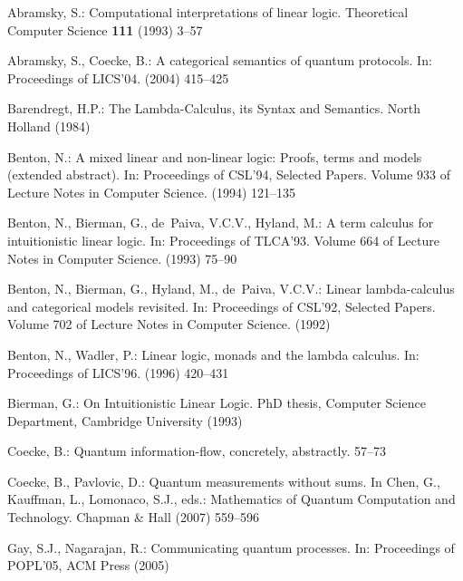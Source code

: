 \documentclass{llncs}
\begin{document}
\begin{thebibliography}{10}

Abramsky, S.:
\newblock Computational interpretations of linear logic.
\newblock Theoretical Computer Science \textbf{111} (1993)  3--57

Abramsky, S., Coecke, B.:
\newblock A categorical semantics of quantum protocols.
\newblock In: Proceedings of LICS'04. (2004)  415--425

Barendregt, H.P.:
\newblock The Lambda-Calculus, its Syntax and Semantics.
\newblock North Holland (1984)

Benton, N.:
\newblock A mixed linear and non-linear logic: Proofs, terms and models
  (extended abstract).
\newblock In: Proceedings of CSL'94, Selected Papers. Volume 933 of Lecture
  Notes in Computer Science. (1994)  121--135

Benton, N., Bierman, G., de~Paiva, V.C.V., Hyland, M.:
\newblock A term calculus for intuitionistic linear logic.
\newblock In: Proceedings of TLCA'93. Volume 664 of Lecture Notes in Computer
  Science. (1993)  75--90

Benton, N., Bierman, G., Hyland, M., de~Paiva, V.C.V.:
\newblock Linear lambda-calculus and categorical models revisited.
\newblock In: Proceedings of CSL'92, Selected Papers. Volume 702 of Lecture
  Notes in Computer Science. (1992)

Benton, N., Wadler, P.:
\newblock Linear logic, monads and the lambda calculus.
\newblock In: Proceedings of LICS'96. (1996)  420--431

Bierman, G.:
\newblock On Intuitionistic Linear Logic.
\newblock PhD thesis, Computer Science Department, Cambridge University (1993)

Coecke, B.:
\newblock Quantum information-flow, concretely, abstractly.
\newblock  \cite{qpl04}  57--73

Coecke, B., Pavlovic, D.:
\newblock Quantum measurements without sums.
\newblock In Chen, G., Kauffman, L., Lomonaco, S.J., eds.: Mathematics of
  Quantum Computation and Technology.
\newblock Chapman \& Hall (2007)  559--596

Gay, S.J., Nagarajan, R.:
\newblock Communicating quantum processes.
\newblock In: Proceedings of POPL'05, ACM Press (2005)


\end{thebibliography}
\end{document}

